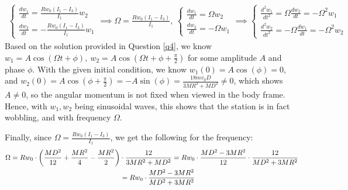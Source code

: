\documentclass{article}
\DeclarePairedDelimiter{\paran}{(}{)}%
\begin{document}
\begin{align}
    \begin{cases}
        \frac{dw_1}{dt}=\frac{Rw_0(I_1-I_3)}{I_1}w_2\\
        \frac{dw_2}{dt}=-\frac{Rw_0(I_1-I_3)}{I_1}w_1
    \end{cases} \implies \Omega = \frac{Rw_0(I_1-I_3)}{I_1},\ \begin{cases}
        \frac{dw_1}{dt}=\Omega w_2\\
        \frac{dw_2}{dt}=-\Omega w_1
    \end{cases}\implies \begin{cases}
        \frac{d^2w_1}{dt^2}=\Omega \frac{dw_2}{dt} = -\Omega^2 w_1\\
        \frac{d^2w_2}{dt^2}=-\Omega \frac{dw_1}{dt} = -\Omega^2 w_2
    \end{cases}
\end{align}
Based on the solution provided in Question \ref{q4}, we know $w_1 = A\cos(\Omega t+\phi),\ w_2=A\cos(\Omega t+\phi+\frac{\pi}{2})$ for some amplitude $A$ and phase $\phi$. With the given initial condition, we know $w_1(0) = A\cos(\phi) = 0$, and $w_2(0)=A\cos(\phi+\frac{\pi}{2}) = -A\sin(\phi) =\frac{18mv_0D}{3MR^2+MD^2}\neq 0$, which shows $A\neq 0$, so the angular momentum is not fixed when viewed in the body frame. Hence, with $w_1,w_2$ being sinusoidal waves, this shows that the station is in fact wobbling, and with frequency $\Omega$.

Finally, since $\Omega = \frac{Rw_0(I_1-I_3)}{I_1}$, we get the following for the frequency:
\begin{align}
    \Omega = Rw_0\cdot \paran*{\frac{MD^2}{12}+\frac{MR^2}{4}-\frac{MR^2}{2}}&\cdot\frac{12}{3MR^2+MD^2} = Rw_0\cdot\frac{MD^2-3MR^2}{12}\cdot \frac{12}{MD^2+3MR^2} \\
    &= Rw_0\cdot\frac{MD^2-3MR^2}{MD^2+3MR^2}
\end{align}
\end{document}
